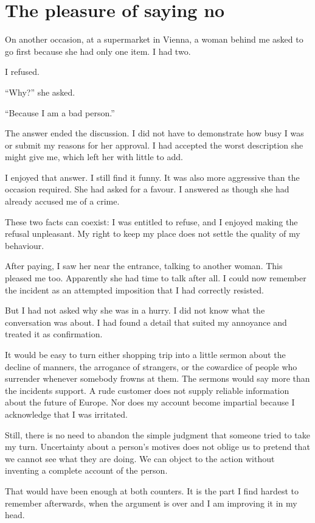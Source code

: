 \documentclass[12pt,a4paper]{book}
\begin{document}
\section*{The pleasure of saying no}

On another occasion, at a supermarket in Vienna, a woman behind me asked to go first because she had only one item. I had two.

I refused.

``Why?'' she asked.

``Because I am a bad person.''

The answer ended the discussion. I did not have to demonstrate how busy I was or submit my reasons for her approval. I had accepted the worst description she might give me, which left her with little to add.

I enjoyed that answer. I still find it funny. It was also more aggressive than the occasion required. She had asked for a favour. I answered as though she had already accused me of a crime.

These two facts can coexist: I was entitled to refuse, and I enjoyed making the refusal unpleasant. My right to keep my place does not settle the quality of my behaviour.

After paying, I saw her near the entrance, talking to another woman. This pleased me too. Apparently she had time to talk after all. I could now remember the incident as an attempted imposition that I had correctly resisted.

But I had not asked why she was in a hurry. I did not know what the conversation was about. I had found a detail that suited my annoyance and treated it as confirmation.

It would be easy to turn either shopping trip into a little sermon about the decline of manners, the arrogance of strangers, or the cowardice of people who surrender whenever somebody frowns at them. The sermons would say more than the incidents support. A rude customer does not supply reliable information about the future of Europe. Nor does my account become impartial because I acknowledge that I was irritated.

Still, there is no need to abandon the simple judgment that someone tried to take my turn. Uncertainty about a person's motives does not oblige us to pretend that we cannot see what they are doing. We can object to the action without inventing a complete account of the person.

That would have been enough at both counters. It is the part I find hardest to remember afterwards, when the argument is over and I am improving it in my head.
\end{document}
